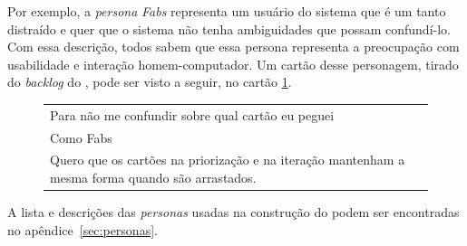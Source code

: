 Por exemplo, a \textit{persona} \textit{Fabs} representa um usuário do sistema que é um tanto distraído e quer que o sistema não tenha ambiguidades que possam confundí-lo. Com essa descrição, todos sabem que essa persona representa a preocupação com usabilidade e interação homem-computador. Um cartão desse personagem, tirado do \textit{backlog} do \calopsita{}, pode ser visto a seguir, no cartão \ref{tabela:fabs}.

\begin{figure}[H]
  \label{tabela:fabs}
  \begin{tabular}{|p{10cm}|}
    \hline
    Para não me confundir sobre qual cartão eu peguei \\
    Como Fabs \\
    Quero que os cartões na priorização e na iteração mantenham a mesma forma quando são arrastados. \\
    \hline
  \end{tabular}
\end{figure}

A lista e descrições das \textit{personas} usadas na construção do \calopsita{} podem ser encontradas no apêndice~\ref{sec:personas}.
